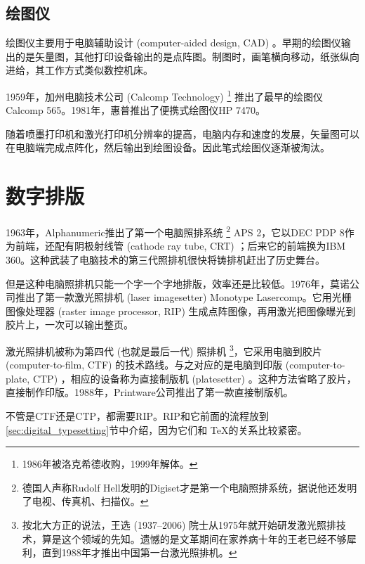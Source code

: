 \subsection{绘图仪}

绘图仪主要用于电脑辅助设计 (computer-aided design, CAD) 。早期的绘图仪输出的是矢量图，其他打印设备输出的是点阵图。制图时，画笔横向移动，纸张纵向进给，其工作方式类似数控机床。

1959年，加州电脑技术公司 (Calcomp Technology)\indexCalcomp{} \footnote{1986年被洛克希德收购，1999年解体。} 推出了最早的绘图仪Calcomp 565。1981年，惠普推出了便携式绘图仪HP 7470。

随着喷墨打印机和激光打印机分辨率的提高，电脑内存和速度的发展，矢量图可以在电脑端完成点阵化，然后输出到绘图设备。因此笔式绘图仪逐渐被淘汰。

\section{数字排版}

1963年，Alphanumeric\indexAlphanumeric{}推出了第一个电脑照排系统 \footnote{德国人声称Rudolf Hell发明的Digiset才是第一个电脑照排系统，据说他还发明了电视、传真机、扫描仪。} APS 2，它以DEC PDP 8作为前端，还配有阴极射线管 (cathode ray tube, CRT) ；后来它的前端换为IBM 360。这种武装了电脑技术的第三代照排机很快将铸排机赶出了历史舞台。

但是这种电脑照排机只能一个字一个字地排版，效率还是比较低。1976年，莫诺公司推出了第一款激光照排机 (laser imagesetter) Monotype Lasercomp。它用光栅图像处理器 (raster image processor, RIP) 生成点阵图像，再用激光把图像曝光到胶片上，一次可以输出整页。

激光照排机被称为第四代 (也就是最后一代) 照排机 \footnote{按北大方正的说法，王选 (1937--2006) 院士从1975年就开始研发激光照排技术，算是这个领域的先知。遗憾的是文革期间在家养病十年的王老已经不够犀利，直到1988年才推出中国第一台激光照排机。}，它采用电脑到胶片 (computer-to-film, CTF) 的技术路线。与之对应的是电脑到印版 (computer-to-plate, CTP) ，相应的设备称为直接制版机 (platesetter) 。这种方法省略了胶片，直接制作印版。1988年，Printware公司\indexPrintware{}推出了第一款直接制版机。

不管是CTF还是CTP，都需要RIP。RIP和它前面的流程放到 \ref{sec:digital_typesetting}节中介绍，因为它们和 \TeX 的关系比较紧密。
